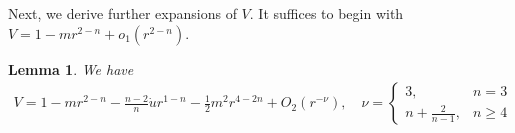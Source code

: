 \documentclass[12pt,twoside]{article}
\theoremstyle{plain}
\newtheorem{lemma}[theorem]{Lemma}
\theoremstyle{definition}
\theoremstyle{remark}
\newtheorem*{rmk}{Remark}
\newcommand{\pl}{\partial}
\newcommand{\na}{\nabla}
\numberwithin{equation}{section}
\begin{document}

Next, we derive further expansions of $V$. It suffices to begin with $V = 1 - mr^{2-n} + o_1(r^{2-n})$.
\begin{lemma}\label{Vdot}
We have
\begin{align*}
V = 1 - m r^{2-n} - \frac{n-2}{n}\dot u r^{1-n} -\frac{1}{2} m^2 r^{4-2n} + O_2(r^{-\nu}), \quad \nu = \begin{cases} 3, & n=3\\ n + \frac{2}{n-1}, & n \ge 4 \end{cases}
\end{align*}
\end{lemma}
\end{document}
